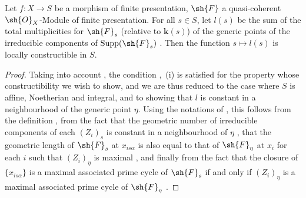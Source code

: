 \begin{proposition}[9.8.8]
\label{IV.9.8.8}
Let $f:X\to S$ be a morphism of finite presentation, $\sh{F}$ a quasi-coherent $\sh{O}_X$-Module of finite presentation.
For all $s\in S$, let $l(s)$ be the sum of the total multiplicities for $\sh{F}_s$ (relative to $\mathbf{k}(s)$) of the generic points of the irreducible components of $\operatorname{Supp}(\sh{F}_s)$ .
Then the function $s\mapsto l(s)$ is locally constructible in $S$.
\end{proposition}

\begin{proof}
\label{IV.9.8.8-proof}
Taking into account , the condition ,~(i) is satisfied for the property whose constructibility we wish to show, and we are thus reduced to the case where $S$ is affine, Noetherian and integral, and to showing that $l$ is constant in a neighbourhood of the generic point $\eta$.
Using the notations of , this follows from the definition , from the fact that the geometric number of irreducible components of each $(Z_i)_s$ is constant in a neighbourhood of $\eta$ , that the geometric length of $\sh{F}_s$ at $x_{is\alpha}$ is also equal to that of $\sh{F}_\eta$ at $x_i$ for each $i$ such that $(Z_i)_\eta$ is maximal , and finally from the fact that the closure of $\{x_{is\alpha}\}$ is a maximal associated prime cycle of $\sh{F}_s$ if and only if $(Z_i)_\eta$ is a maximal associated prime cycle of $\sh{F}_\eta$ .
\end{proof}

